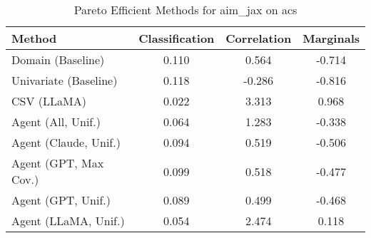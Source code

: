 \begin{table}[t!]
    \centering
    \caption{Pareto Efficient Methods for aim_jax on acs}
    \label{tab:pareto_efficient_methods_aim_jax_acs}
    \begin{tabular}{lccc}
    \toprule
    Method & Classification & Correlation & Marginals \\
    \midrule
    Domain (Baseline) & 0.110 & 0.564 & \cellcolor{silver!30}-0.714 \\
    Univariate (Baseline) & 0.118 & \cellcolor{gold!30}-0.286 & \cellcolor{gold!30}-0.816 \\
    CSV (LLaMA) & \cellcolor{gold!30}0.022 & 3.313 & 0.968 \\
    Agent (All, Unif.) & \cellcolor{bronze!30}0.064 & 1.283 & -0.338 \\
    Agent (Claude, Unif.) & 0.094 & 0.519 & \cellcolor{bronze!30}-0.506 \\
    Agent (GPT, Max Cov.) & 0.099 & \cellcolor{bronze!30}0.518 & -0.477 \\
    Agent (GPT, Unif.) & 0.089 & \cellcolor{silver!30}0.499 & -0.468 \\
    Agent (LLaMA, Unif.) & \cellcolor{silver!30}0.054 & 2.474 & 0.118 \\
    \bottomrule
    \end{tabular}
\end{table}